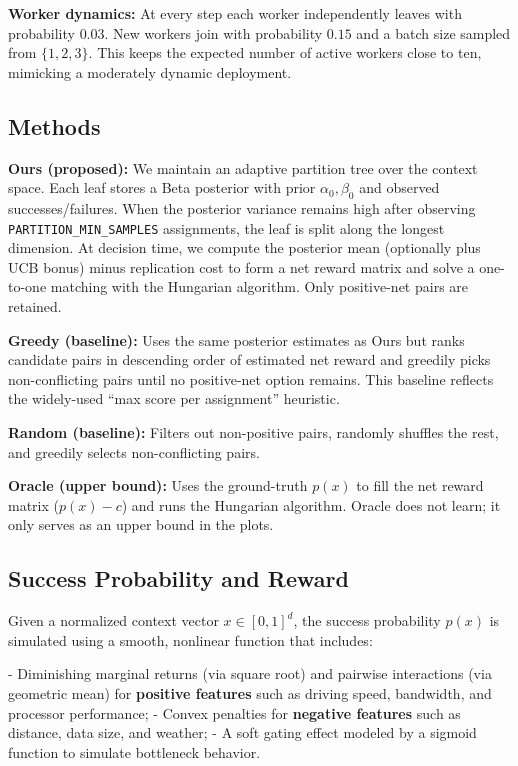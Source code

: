 \textbf{Worker dynamics:} At every step each worker independently leaves with probability $0.03$. New workers join with probability $0.15$ and a batch size sampled from $\{1,2,3\}$. This keeps the expected number of active workers close to ten, mimicking a moderately dynamic deployment.

\subsection{Methods}

\textbf{Ours (proposed):} We maintain an adaptive partition tree over the context space. Each leaf stores a Beta posterior with prior $\alpha_0,\beta_0$ and observed successes/failures. When the posterior variance remains high after observing \texttt{PARTITION\_MIN\_SAMPLES} assignments, the leaf is split along the longest dimension. At decision time, we compute the posterior mean (optionally plus UCB bonus) minus replication cost to form a net reward matrix and solve a one-to-one matching with the Hungarian algorithm. Only positive-net pairs are retained.

\textbf{Greedy (baseline):} Uses the same posterior estimates as Ours but ranks candidate pairs in descending order of estimated net reward and greedily picks non-conflicting pairs until no positive-net option remains. This baseline reflects the widely-used ``max score per assignment'' heuristic.

\textbf{Random (baseline):} Filters out non-positive pairs, randomly shuffles the rest, and greedily selects non-conflicting pairs.

\textbf{Oracle (upper bound):} Uses the ground-truth $p(x)$ to fill the net reward matrix ($p(x)-c$) and runs the Hungarian algorithm. Oracle does not learn; it only serves as an upper bound in the plots.

\subsection{Success Probability and Reward}
Given a normalized context vector $x \in [0,1]^d$, the success probability $p(x)$ is simulated using a smooth, nonlinear function that includes:

- Diminishing marginal returns (via square root) and pairwise interactions (via geometric mean) for \textbf{positive features} such as driving speed, bandwidth, and processor performance;
- Convex penalties for \textbf{negative features} such as distance, data size, and weather;
- A soft gating effect modeled by a sigmoid function to simulate bottleneck behavior.

